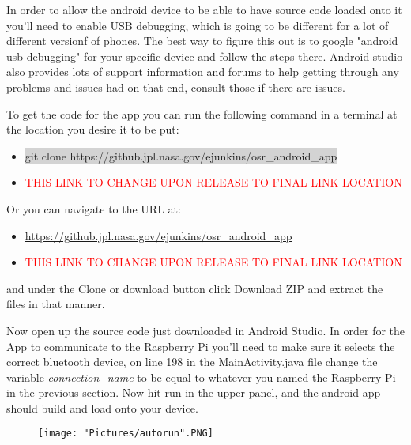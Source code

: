 \documentclass[12pt]{article}
\begin{document}
\noindent In order to allow the android device to be able to have source code loaded onto it you'll need to enable USB debugging, which is going to be different for a lot of different versionf of phones. The best way to figure this out is to google "android usb debugging" for your specific device and follow the steps there. Android studio also provides lots of support information and forums to help getting through any problems and issues had on that end, consult those if there are issues.

\bigskip

\noindent To get the code for the app you can run the following command in a terminal at the location you desire it to be put:

\begin{itemize}
	\item[] \colorbox{lightgray}{git clone https://github.jpl.nasa.gov/ejunkins/osr\_android\_app}
	\item[] \textcolor{red}{THIS LINK TO CHANGE UPON RELEASE TO FINAL LINK LOCATION}
\end{itemize}

\noindent Or you can navigate to the URL at:

\begin{itemize}
	\item[] \href{https://github.jpl.nasa.gov/ejunkins/osr_android_app}{https://github.jpl.nasa.gov/ejunkins/osr\_android\_app}
	\item[] \textcolor{red}{THIS LINK TO CHANGE UPON RELEASE TO FINAL LINK LOCATION}
\end{itemize}

\noindent and under the Clone or download button click Download ZIP and extract the files in that manner. 

\bigskip

\noindent Now open up the source code just downloaded in Android Studio. In order for the App to communicate to the Raspberry Pi you'll need to make sure it selects the correct bluetooth device, on line 198 in the MainActivity.java file change the variable \textit{connection\_name} to be equal to whatever you named the Raspberry Pi in the previous section. Now hit run in the upper panel, and the android app should build and load onto your device. 

\begin{figure}[H]
 	\centering
	\texttt{[image: "Pictures/autorun".PNG]}
 	\caption{}
	\label{}
\end{figure}
\end{document}
